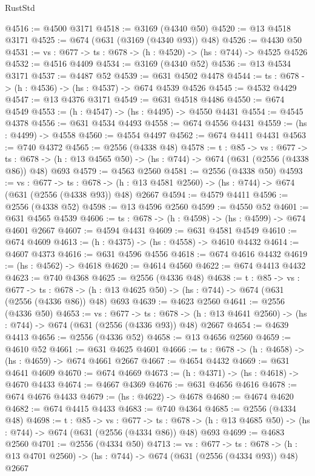 \begin{lexlean}{RustStd}
\begin{coremodule}
@4516 := @4500 @3171
@4518 := @3169 (@4340 @50)
@4520 := @13 @4518 @3171
@4525 := @674 (@631 (@3169 (@4340 @93)) @48)
@4526 := @4430 @50
@4531 := {vs : @677} -> {ts : @678} -> (h : @4520) -> (hs : @744) -> @4525 @4526
@4532 := @4516 @4409
@4534 := @3169 (@4340 @52)
@4536 := @13 @4534 @3171
@4537 := @4487 @52
@4539 := @631 @4502 @4478
@4544 := {ts : @678} -> (h : @4536) -> (hs : @4537) -> @674 @4539 @4526
@4545 := @4532 @4429
@4547 := @13 @4376 @3171
@4549 := @631 @4518 @4486
@4550 := @674 @4549
@4553 := (h : @4547) -> (hs : @4495) -> @4550 @4431
@4554 := @4545 @4378
@4556 := @631 @4534 @4493
@4558 := @674 @4556 @4431
@4559 := (hs : @4499) -> @4558
@4560 := @4554 @4497
@4562 := @674 @4411 @4431
@4563 := @740 @4372
@4565 := @2556 (@4338 @48)
@4578 := {t : @85} ->
  {vs : @677} ->
  {ts : @678} -> (h : @13 @4565 @50) -> (hs : @744) -> @674 (@631 (@2556 (@4338 @86)) @48) @693
@4579 := @4563 @2560
@4581 := @2556 (@4338 @50)
@4593 := {vs : @677} ->
  {ts : @678} -> (h : @13 @4581 @2560) -> (hs : @744) -> @674 (@631 (@2556 (@4338 @93)) @48) @2667
@4594 := @4579 @4411
@4596 := @2556 (@4338 @52)
@4598 := @13 @4596 @2560
@4599 := @4550 @52
@4601 := @631 @4565 @4539
@4606 := {ts : @678} -> (h : @4598) -> (hs : @4599) -> @674 @4601 @2667
@4607 := @4594 @4431
@4609 := @631 @4581 @4549
@4610 := @674 @4609
@4613 := (h : @4375) -> (hs : @4558) -> @4610 @4432
@4614 := @4607 @4373
@4616 := @631 @4596 @4556
@4618 := @674 @4616 @4432
@4619 := (hs : @4562) -> @4618
@4620 := @4614 @4560
@4622 := @674 @4413 @4432
@4623 := @740 @4368
@4625 := @2556 (@4336 @48)
@4638 := {t : @85} ->
  {vs : @677} ->
  {ts : @678} -> (h : @13 @4625 @50) -> (hs : @744) -> @674 (@631 (@2556 (@4336 @86)) @48) @693
@4639 := @4623 @2560
@4641 := @2556 (@4336 @50)
@4653 := {vs : @677} ->
  {ts : @678} -> (h : @13 @4641 @2560) -> (hs : @744) -> @674 (@631 (@2556 (@4336 @93)) @48) @2667
@4654 := @4639 @4413
@4656 := @2556 (@4336 @52)
@4658 := @13 @4656 @2560
@4659 := @4610 @52
@4661 := @631 @4625 @4601
@4666 := {ts : @678} -> (h : @4658) -> (hs : @4659) -> @674 @4661 @2667
@4667 := @4654 @4432
@4669 := @631 @4641 @4609
@4670 := @674 @4669
@4673 := (h : @4371) -> (hs : @4618) -> @4670 @4433
@4674 := @4667 @4369
@4676 := @631 @4656 @4616
@4678 := @674 @4676 @4433
@4679 := (hs : @4622) -> @4678
@4680 := @4674 @4620
@4682 := @674 @4415 @4433
@4683 := @740 @4364
@4685 := @2556 (@4334 @48)
@4698 := {t : @85} ->
  {vs : @677} ->
  {ts : @678} -> (h : @13 @4685 @50) -> (hs : @744) -> @674 (@631 (@2556 (@4334 @86)) @48) @693
@4699 := @4683 @2560
@4701 := @2556 (@4334 @50)
@4713 := {vs : @677} ->
  {ts : @678} -> (h : @13 @4701 @2560) -> (hs : @744) -> @674 (@631 (@2556 (@4334 @93)) @48) @2667

\end{coremodule}
\end{lexlean}
